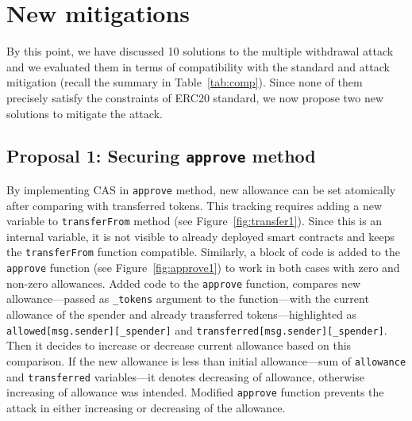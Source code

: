 
\section{New mitigations}

By this point, we have discussed 10 solutions to the multiple withdrawal attack and we evaluated them in terms of compatibility with the standard and attack mitigation (recall the summary in Table~\ref{tab:comp}). Since none of them precisely satisfy the constraints of ERC20 standard, we now propose two new solutions to mitigate the attack.

\subsection{Proposal 1: Securing \texttt{approve} method}
\label{sec:proposal1}


By implementing CAS \cite{Ref06} in \texttt{approve} method, new allowance can be set atomically after comparing with transferred tokens. This tracking requires adding a new variable to \texttt{transferFrom} method (see Figure~\ref{fig:transfer1}). Since this is an internal variable, it is not visible to already deployed smart contracts and keeps the \texttt{transferFrom} function compatible. Similarly, a block of code is added to the \texttt{approve} function (see Figure~\ref{fig:approve1}) to work in both cases with zero and non-zero allowances. Added code to the \texttt{approve} function, compares new allowance---passed as \texttt{\_tokens} argument to the function---with the current allowance of the spender and already transferred tokens---highlighted as \texttt{allowed[msg.sender][\_spender]} and \texttt{transferred[msg.sender][\_spender]}. Then it decides to increase or decrease current allowance based on this comparison. If the new allowance is less than initial allowance---sum of \texttt{allowance} and \texttt{transferred} variables---it denotes decreasing of allowance, otherwise increasing of allowance was intended. Modified \texttt{approve} function prevents the attack in either increasing or decreasing of the allowance.

